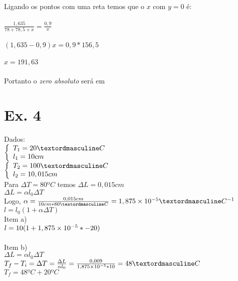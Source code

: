 Ligando os pontos com uma reta temos que o $x$ com $y=0$ é: \\ \\
$\frac{1,635}{78+78,5+x} = \frac{0,9}{x}$ \\ \\
$(1,635-0,9)x = 0,9 * 156,5$\\ \\
$x = 191,63$\\ \\

Portanto o \textit{zero absoluto} será em \\

\section{Ex. 4}

Dados: \\
$ \left\{
	  \begin{array}{l l}
		  T_{1} = 20ºC \\
		  l_{1}=10cm \\
	  \end{array}
  \right.
$ \\
$ \left\{
  	\begin{array}{l l}
		  T_{2} = 100ºC \\
		  l_{2}=10,015cm \\
	  \end{array}
  \right.
$ \\

Para $\Delta T=80ºC$ temos $\Delta L=0,015cm$\\
$\Delta L = \alpha l_{0}\Delta T$\\
Logo, $\alpha = \frac{0,015cm}{10cm*80ºC} = 1,875\e{-5}ºC^{-1}$\\
$ l = l_{0}(1 + \alpha\Delta T)$\\
Item a)\\
$l = 10(1+1,875\times 10^{-5}*-20)$\\
\\
Item b)\\
$\Delta L = \alpha l_{0}\Delta T$\\
$T_{f} - T_{i} = \Delta T = \frac{\Delta L}{\alpha l_{0}} = \frac{0,009}{1,875\e{-5}*10} = 48ºC$\\
$T_{f} = 48ºC + 20ºC$\\
\\

